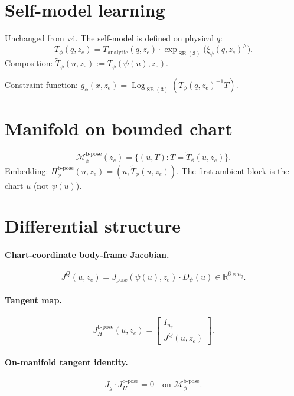 \documentclass[11pt,a4paper]{article}
\DeclareMathOperator{\Log}{Log}
\DeclareMathOperator{\SE}{SE}
\newcommand{\R}{\mathbb{R}}
\newcommand{\Mbpose}{\mathcal{M}_\phi^{\text{b-pose}}}
\newcommand{\Tphi}{T_\phi}
\newcommand{\Hbpose}{H_\phi^{\text{b-pose}}}
\newcommand{\Jpose}{J_{\text{pose}}}
\newcommand{\JQ}{J^Q}
\newcommand{\psimap}{\psi}
\newcommand{\Dpsi}{D_\psimap}
\begin{document}
\section{Self-model learning}
\label{sec:self-model}

Unchanged from v4. The self-model is defined on physical $q$:
\begin{equation}
\Tphi(q, z_e) = T_\text{analytic}(q, z_e) \cdot \exp_{\SE(3)}\!\bigl(\xi_\phi(q, z_e)^\wedge\bigr).
\end{equation}
Composition: $\widetilde T_\phi(u, z_e) := \Tphi(\psi(u), z_e)$.

Constraint function: $g_\phi(x, z_e) = \Log_{\SE(3)}(\Tphi(q, z_e)^{-1} T)$.

\section{Manifold on bounded chart}
\label{sec:manifold}

\begin{equation}
\Mbpose(z_e) = \bigl\{(u, T) : T = \widetilde T_\phi(u, z_e)\bigr\}.
\end{equation}
Embedding: $\Hbpose(u, z_e) = (u, \widetilde T_\phi(u, z_e))$. The first ambient block is the chart $u$ (not $\psi(u)$).

\section{Differential structure}
\label{sec:tangent}

\paragraph{Chart-coordinate body-frame Jacobian.}
\begin{equation}
\JQ(u, z_e) = \Jpose(\psi(u), z_e) \cdot \Dpsi(u) \in \R^{6 \times n_q}.
\end{equation}

\paragraph{Tangent map.}
\begin{equation}
J_H^{\text{b-pose}}(u, z_e) = \begin{bmatrix} I_{n_q} \\ \JQ(u, z_e) \end{bmatrix}.
\end{equation}

\paragraph{On-manifold tangent identity.}
\begin{equation}
J_g \cdot J_H^{\text{b-pose}} = 0 \quad \text{on } \Mbpose.
\end{equation}
\end{document}

